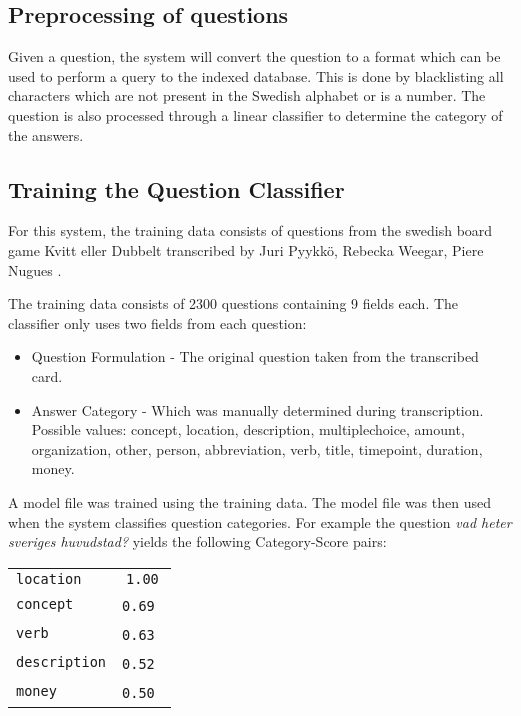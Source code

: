 \subsection{Preprocessing of questions}
Given a question, the system will convert the question
to a format which can be used to perform a query to the indexed
database. This is done by blacklisting all characters which
are not present in the Swedish alphabet or is a number. The question is also
processed through a linear classifier to determine the category of the 
answers.

\subsection{Training the Question Classifier}
For this system, the training data consists of questions 
from the swedish board game Kvitt eller Dubbelt transcribed 
by Juri Pyykk\"o, Rebecka Weegar, Piere Nugues \cite{QASYS}.

The training data consists of 2300 questions containing 9 fields each.
The classifier only uses two fields from each question:
\begin{itemize}
\item Question Formulation - The original question taken from the transcribed
  card.
\item Answer Category - Which was manually determined during transcription. 
  Possible values: concept, location, description, multiplechoice, amount, organization, 
  other, person, abbreviation, verb, title, timepoint, duration, money.
\end{itemize}
A model file was trained using the training data. The model file was then used when the system 
classifies question categories. For example the question \textit{vad heter sveriges huvudstad?} 
yields the following Category-Score pairs:
\begin{center}
  \begin{tabular} {l c}
    \texttt{location}    & \texttt{1.00} \\
    \texttt{concept}     & \texttt{0.69} \\
    \texttt{verb}        & \texttt{0.63} \\
    \texttt{description} & \texttt{0.52} \\
    \texttt{money}       & \texttt{0.50} \\
  \end{tabular}
\end{center}
